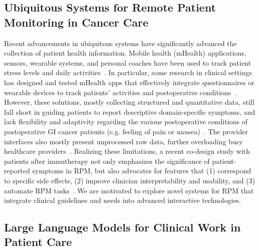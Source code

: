 \subsection{Ubiquitous Systems for Remote Patient Monitoring in Cancer Care}
\label{sub:related_work-2}
Recent advancements in ubiquitous systems have significantly advanced the collection of patient health information.
Mobile health (mHealth) applications, sensors, wearable systems, and personal coaches have been used to track patient stress levels and daily activities~\cite{goncalves-bradley_mobile_2020,segoviaSmartphonebasedEcologicalMomentary2020, kingMicroStressEMAPassive2019, jacobsMyPathInvestigatingBreast2018}. 
In particular, some research in clinical settings has designed and tested mHealth apps that effectively integrate questionnaires or wearable devices to track patients' activities and postoperative conditions~\cite{sempleUsingMobileApp2015, ghods2021remote}.
However, these solutions, mostly collecting structured and quantitative data, still fall short in guiding patients to report descriptive domain-specific symptoms, and lack flexibility and adaptivity regarding the various postoperative conditions of postoperative GI cancer patients (e.g. feeling of pain or nausea)~\cite{yangWishThereWere2024}. The provider interfaces also mostly present unprocessed raw data, further overloading busy healthcare providers~\cite{yangWishThereWere2024, sempleUsingMobileApp2015}. 
Realizing these limitations, a recent co-design study with patients after immutherapy not only  emphasizes the significance of patient-reported symptoms in RPM, but also advocates for features that (1) correspond to specific side effects, (2) improve clinician interpretability and usability, and (3) automate RPM tasks~\cite{lai2024co}. 
We are motivated to explore novel systems for RPM that integrate clinical guidelines and needs into advanced interactive technologies.

\subsection{Large Language Models for Clinical Work in Patient Care}

